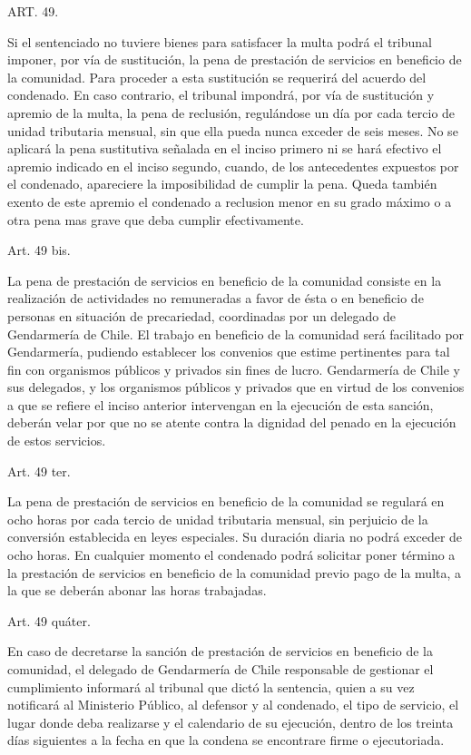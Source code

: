     ART. 49.

    Si el sentenciado no tuviere bienes para satisfacer la multa podrá el tribunal imponer, por vía de sustitución, la pena de prestación de servicios en beneficio de la comunidad.
    Para proceder a esta sustitución se requerirá del acuerdo del condenado. En caso contrario, el tribunal impondrá, por vía de sustitución y apremio de la multa, la pena de reclusión, regulándose un día por cada tercio de unidad tributaria mensual, sin que ella pueda nunca exceder de seis meses.
    No se aplicará la pena sustitutiva señalada en el inciso primero ni se hará efectivo el apremio indicado en el inciso segundo, cuando, de los antecedentes expuestos por el condenado, apareciere la imposibilidad de cumplir la pena.
    Queda también exento de este apremio el condenado a reclusion menor en su grado máximo o a otra pena mas grave que deba cumplir efectivamente.



    Art. 49 bis.

    La pena de prestación de servicios en beneficio de la comunidad consiste en la realización de actividades no remuneradas a favor de ésta o en beneficio de personas en situación de precariedad, coordinadas por un delegado de Gendarmería de Chile.
    El trabajo en beneficio de la comunidad será facilitado por Gendarmería, pudiendo establecer los convenios que estime pertinentes para tal fin con organismos públicos y privados sin fines de lucro.
    Gendarmería de Chile y sus delegados, y los organismos públicos y privados que en virtud de los convenios a que se refiere el inciso anterior intervengan en la ejecución de esta sanción, deberán velar por que no se atente contra la dignidad del penado en la ejecución de estos servicios.


    Art. 49 ter.

    La pena de prestación de servicios en beneficio de la comunidad se regulará en ocho horas por cada tercio de unidad tributaria mensual, sin perjuicio de la conversión establecida en leyes especiales.
    Su duración diaria no podrá exceder de ocho horas.
    En cualquier momento el condenado podrá solicitar poner término a la prestación de servicios en beneficio de la comunidad previo pago de la multa, a la que se deberán abonar las horas trabajadas.



    Art. 49 quáter.

    En caso de decretarse la sanción de prestación de servicios en beneficio de la comunidad, el delegado de Gendarmería de Chile responsable de gestionar el cumplimiento informará al tribunal que dictó la sentencia, quien a su vez notificará al Ministerio Público, al defensor y al condenado, el tipo de servicio, el lugar donde deba realizarse y el calendario de su ejecución, dentro de los treinta días siguientes a la fecha en que la condena se encontrare firme o ejecutoriada.


